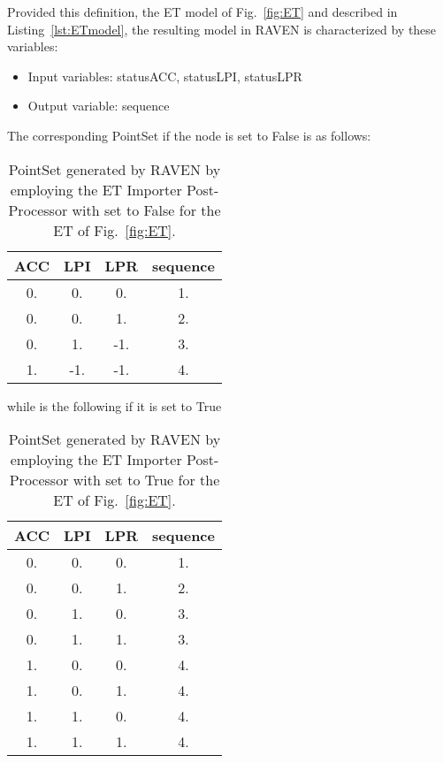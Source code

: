 Provided this definition, the ET model of Fig.~\ref{fig:ET} and described in Listing~\ref{lst:ETmodel}, 
the resulting model in RAVEN is characterized by these variables:
\begin{itemize}
	\item Input variables: statusACC, statusLPI, statusLPR
	\item Output variable: sequence
\end{itemize}
The corresponding PointSet if the  node is set to False is as follows:
\begin{table}
    \centering
    \caption{PointSet generated by RAVEN by employing the ET Importer Post-Processor with  
             set to False for the ET of Fig.~\ref{fig:ET}.}
	\begin{tabular}{c | c | c | c} 
		\hline 
		ACC & LPI & LPR & sequence \\ 
		\hline 
		0.  &  0. &  0. & 1. \\
		0.  &  0. &  1. & 2. \\
		0.  &  1. & -1. & 3. \\
		1.  & -1. & -1. & 4. \\
		\hline 
	\end{tabular}
\end{table}
while is the following if it is set to True
\begin{table}
    \centering
    \caption{PointSet generated by RAVEN by employing the ET Importer Post-Processor with  
             set to True for the ET of Fig.~\ref{fig:ET}.}
	\begin{tabular}{c | c | c | c} 
		\hline 
		ACC & LPI & LPR & sequence \\ 
		\hline 
		0.  &  0. &  0. & 1. \\
		0.  &  0. &  1. & 2. \\
		0.  &  1. &  0. & 3. \\
		0.  &  1. &  1. & 3. \\
		1.  &  0. &  0. & 4. \\
		1.  &  0. &  1. & 4. \\
		1.  &  1. &  0. & 4. \\
		1.  &  1. &  1. & 4. \\
		\hline 
	\end{tabular}
\end{table}

